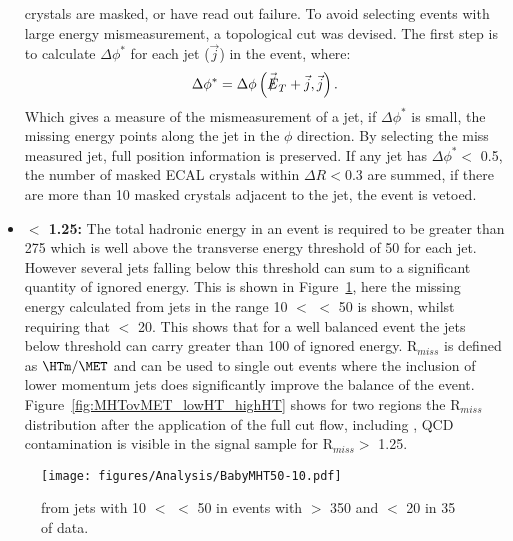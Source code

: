 \begin{itemize}
crystals are masked, or have read out failure. To avoid selecting events with 
large energy mismeasurement, a topological cut was devised. The first step is 
to calculate $\Delta\phi^{*}$ for each jet ($\vec{j}$) in the event, where:
\begin{equation}
  \Delta\phi^{*} = \Delta\phi\left(\vec{\slashed{E}}_{T}+\vec{j},\vec{j} \right).
  \label{eq:biasedDphi}
\end{equation}
Which gives a measure of the mismeasurement of a jet, if $\Delta\phi^{*}$ is 
small, the missing energy points along the jet in the $\phi$ direction. By 
selecting the miss measured jet, full position information is preserved. If any 
jet has $\Delta\phi^{*} <$ 0.5, the number of masked ECAL crystals within 
$\Delta R < $0.3 are summed, if there are more than 10 masked crystals adjacent 
to the jet, the event is vetoed.
\item \textbf{\Rmiss$ <$ 1.25:} The total hadronic energy in an event is 
required to be greater than \unit{275}{\GeV} which is well above the transverse 
energy threshold of \unit{50}{\GeV} for each jet. However several jets falling 
below this threshold can sum to a significant quantity of ignored energy. This 
is shown in Figure~\ref{fig:figures_Analysis_BabyMHT50-10}, here the missing 
energy calculated from jets in the range \unit{10}{\GeV} $<$ \ET $<$ 
\unit{50}{\GeV} is shown, whilst requiring that \MET $<$ \unit{20}{\GeV}. This 
shows that for a well balanced event the jets below threshold can carry greater 
than \unit{100}{\GeV} of ignored energy. R$_{miss}$ is defined as $\HTm \slash 
\MET$ and can be used to single out events where the inclusion of lower 
momentum jets does significantly improve the balance of the event. 
Figure~\ref{fig:MHTovMET_lowHT_highHT} shows for two \HT regions the R$_{miss}$ 
distribution after the application of the full cut flow, including \alt, QCD 
contamination is visible in the signal sample for R$_{miss} >$ 1.25. 
\end{itemize}


\begin{figure}[htbp]
  \centering
    \texttt{[image: figures/Analysis/BabyMHT50-10.pdf]}
  \caption{\HTm from jets with \unit{10}{\GeV} $<$ \ET $<$ \unit{50}{\GeV} in events with \HT $>$ \unit{350}{\GeV} and \MET $<$ \unit{20}{\GeV} in \unit{35}{\invpicobarn} of data.}
  \label{fig:figures_Analysis_BabyMHT50-10}
\end{figure}

